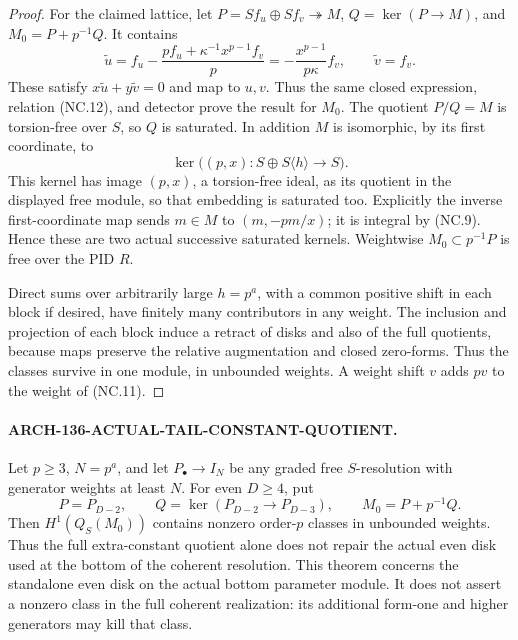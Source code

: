 \begin{proof}
For the claimed lattice, let
\(P=S f_u\oplus S f_v\twoheadrightarrow M\),
\(Q=\ker(P\to M)\), and \(M_0=P+p^{-1}Q\).
It contains
\[
 \widetilde u=f_u-
       \frac{p f_u+\kappa^{-1}x^{p-1}f_v}{p}
          =-\frac{x^{p-1}}{p\kappa}f_v,
 \qquad \widetilde v=f_v.                               \tag{NC.13}
\]
These satisfy \(x\widetilde u+y\widetilde v=0\) and map
to \(u,v\).  Thus the same closed expression, relation
(NC.12), and detector prove the result for \(M_0\).
The quotient \(P/Q=M\) is torsion-free over \(S\), so
\(Q\) is saturated.  In addition \(M\) is isomorphic,
by its first coordinate, to
\[
          \ker\bigl((p,x):S\oplus S\langle h\rangle\to S\bigr).
\]
This kernel has image \((p,x)\), a torsion-free ideal, as
its quotient in the displayed free module, so that embedding
is saturated too.  Explicitly the inverse first-coordinate map
sends \(m\in M\) to \((m,-pm/x)\); it is integral by
(NC.9).  Hence these are two actual successive saturated kernels.
Weightwise \(M_0\subset p^{-1}P\) is free over the PID \(R\).

Direct sums over arbitrarily large \(h=p^a\), with a common
positive shift in each block if desired, have finitely many
contributors in any weight.  The inclusion and projection of
each block induce a retract of disks and also of the full
quotients, because maps preserve the relative augmentation and
closed zero-forms.  Thus the classes survive in one module,
in unbounded weights.  A weight shift \(v\) adds \(pv\)
to the weight of (NC.11).
\end{proof}

\paragraph{ARCH-136-ACTUAL-TAIL-CONSTANT-QUOTIENT.}
Let \(p\geq3\), \(N=p^a\), and let
\(P_\bullet\to I_N\) be any graded free \(S\)-resolution
with generator weights at least \(N\).  For even \(D\geq4\),
put
\[
 P=P_{D-2},\qquad Q=\ker(P_{D-2}\to P_{D-3}),\qquad
                         M_0=P+p^{-1}Q.                 \tag{NC.14}
\]
Then \(H^1(Q_S(M_0))\) contains nonzero order-\(p\) classes
in unbounded weights.  Thus the full extra-constant quotient
alone does not repair the actual even disk used at the bottom
of the coherent resolution.  This theorem concerns the standalone
even disk on the actual bottom parameter module.  It does not assert
a nonzero class in the full coherent realization: its additional
form-one and higher generators may kill that class.


